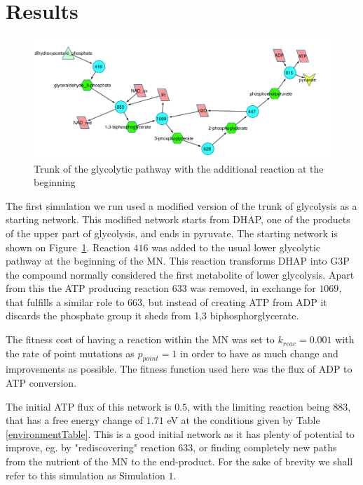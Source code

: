 \documentclass[a4paper,12pt]{article}
\begin{document}
\section{Results}
\label{sec:results}

\begin{figure}[htpb]
	\centering
	\includegraphics[width=1\linewidth]{trunk_glyc_init_large.pdf}
	\caption{Trunk of the glycolytic pathway with the additional reaction at the beginning}
	\label{fig:truncglycinit}
\end{figure}

The first simulation we run used a modified version of the trunk of glycolysis as a starting network. This modified network starts from DHAP, one of the products of the upper part of glycolysis, and ends in pyruvate. The starting network is shown on Figure~\ref{fig:truncglycinit}. Reaction $416$ was added to the usual lower glycolytic pathway at the beginning of the MN. This reaction transforms DHAP into G3P the compound normally considered the first metabolite of lower glycolysis. Apart from this the ATP producing reaction $633$ was removed, in exchange for $1069$, that fulfills a similar role to $663$, but instead of creating ATP from ADP it discards the phosphate group it sheds from 1,3 biphosphorglycerate.

The fitness cost of having a reaction within the MN was set to $k_{reac}=0.001$ with the rate of point mutations as $p_{point}=1$ in order to have as much change and improvements as possible. The fitness function used here was the flux of ADP to ATP conversion.

The initial ATP flux of this network is $0.5$, with the limiting reaction being $883$, that has a free energy change of $1.71$ eV at the conditions given by Table \ref{environmentTable}. This is a good initial network as it has plenty of potential to improve, eg. by "rediscovering" reaction $633$, or finding completely new paths from the nutrient of the MN to the end-product. For the sake of brevity we shall refer to this simulation as Simulation $1$.
\end{document}
